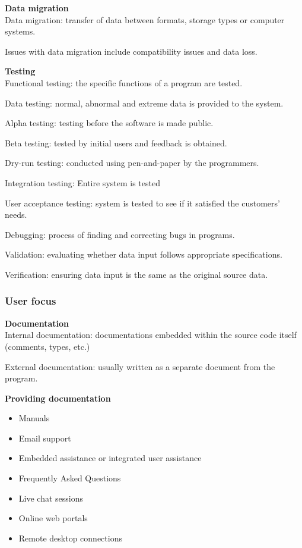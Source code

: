 \documentclass{article}
\begin{document}
\textbf{Data migration} \\
Data migration: transfer of data between formats, storage types or computer
systems.

Issues with data migration include compatibility issues and data loss.

\textbf{Testing} \\
Functional testing: the specific functions of a program are tested.

Data testing: normal, abnormal and extreme data is provided to the system.

Alpha testing: testing before the software is made public.

Beta testing: tested by initial users and feedback is obtained.

Dry-run testing: conducted using pen-and-paper by the programmers.

Integration testing: Entire system is tested

User acceptance testing: system is tested to see if it satisfied the customers'
needs.

Debugging: process of finding and correcting bugs in programs.

Validation: evaluating whether data input follows appropriate specifications.

Verification: ensuring data input is the same as the original source data.

\subsubsection{User focus}

\textbf{Documentation} \\
Internal documentation: documentations embedded within the source code itself
(comments, types, etc.)

External documentation: usually written as a separate document from the
program.

\textbf{Providing documentation}
\begin{itemize}
    \item Manuals
    \item Email support
    \item Embedded assistance or integrated user assistance
    \item Frequently Asked Questions
    \item Live chat sessions
    \item Online web portals
    \item Remote desktop connections
\end{itemize}
\end{document}
